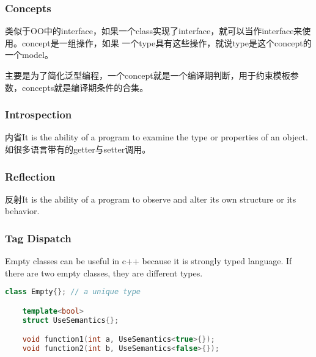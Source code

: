 \subsubsection{Concepts}
类似于OO中的interface，如果一个class实现了interface，就可以当作interface来使用。concept是一组操作，如果
一个type具有这些操作，就说type是这个concept的一个model。

主要是为了简化泛型编程，一个concept就是一个编译期判断，用于约束模板参数，concepts就是编译期条件的合集。

\subsubsection{Introspection}
内省It is the ability of a program to examine the type or properties of an object.
如很多语言带有的getter与setter调用。

\subsubsection{Reflection}
反射It is the ability of a program to observe and alter its own structure or its behavior.

\subsubsection{Tag Dispatch}
Empty classes can be useful in c++ because it is strongly typed language. If there are two 
empty classes, they are different types.
\begin{lstlisting}[language=c++]
    class Empty{}; // a unique type

    template<bool>
    struct UseSemantics{};

    void function1(int a, UseSemantics<true>{});
    void function2(int b, UseSemantics<false>{});    
\end{lstlisting} 